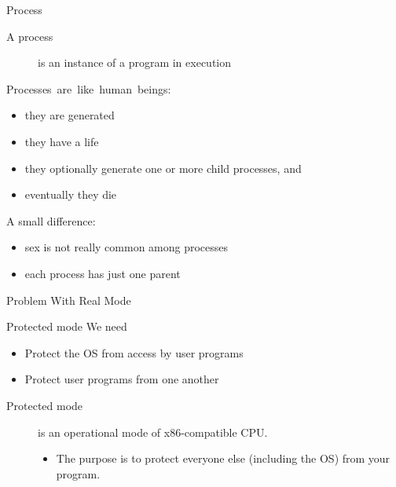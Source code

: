 \begin{frame}{Process}
  \begin{description}
  \item[A process] is an instance of a program in execution
  \end{description}
  \begin{minipage}{.65\linewidth}
    \begin{block}{\mbox{Processes are like human beings:}}
        \begin{itemize}
        \item[\Symbol{➠}] they are generated
        \item[\Symbol{➠}] they have a life
        \item[\Symbol{➠}] they optionally generate one or more child processes, and
        \item[\Symbol{➠}] eventually they die
        \end{itemize}
        A small difference:
        \begin{itemize}
        \item sex is not really common among processes
        \item each process has just one parent
        \end{itemize}
      \end{block}
  \end{minipage}\quad
  \begin{minipage}{.3\linewidth}
    \begin{center}
    \end{center}
  \end{minipage}
\end{frame}

\begin{frame}{Problem With Real Mode}
  \centering
  \mode<beamer>{ \texttt{[image: mm-relocation]} }%
\end{frame}

\begin{frame}{Protected mode}
  We need
  \begin{itemize}
  \item Protect the OS from access by user programs
  \item Protect user programs from one another
  \end{itemize}
  \begin{description}
  \item[Protected mode] is an operational mode of x86-compatible CPU.
    \begin{itemize}
    \item The purpose is to protect everyone else (including the OS) from your program.
    \end{itemize}
  \end{description}
\end{frame}

